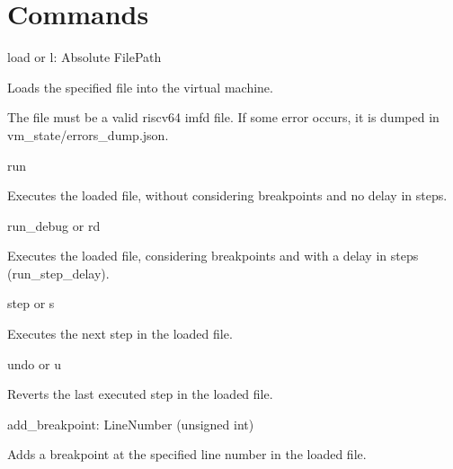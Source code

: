 \chapter{Commands}
\hypertarget{md_COMMANDS}{}\label{md_COMMANDS}
\label{md_COMMANDS_autotoc_md0}%
%

\begin{DoxyItemize}
\item {\ttfamily load} or {\ttfamily l}\+: {\ttfamily Absolute File\+Path} ~\newline

\begin{DoxyItemize}
\item Loads the specified file into the virtual machine.
\item The file must be a valid riscv64 imfd file. If some error occurs, it is dumped in {\ttfamily vm\+\_\+state/errors\+\_\+dump.\+json}.
\end{DoxyItemize}
\item {\ttfamily run}
\begin{DoxyItemize}
\item Executes the loaded file, without considering breakpoints and no delay in steps.
\end{DoxyItemize}
\item {\ttfamily run\+\_\+debug} or {\ttfamily rd}
\begin{DoxyItemize}
\item Executes the loaded file, considering breakpoints and with a delay in steps (run\+\_\+step\+\_\+delay).
\end{DoxyItemize}
\item {\ttfamily step} or {\ttfamily s}
\begin{DoxyItemize}
\item Executes the next step in the loaded file.
\end{DoxyItemize}
\item {\ttfamily undo} or {\ttfamily u}
\begin{DoxyItemize}
\item Reverts the last executed step in the loaded file.
\end{DoxyItemize}
\item {\ttfamily add\+\_\+breakpoint}\+: {\ttfamily Line\+Number} (unsigned int)
\begin{DoxyItemize}
\item Adds a breakpoint at the specified line number in the loaded file.
\end{DoxyItemize}

\end{DoxyItemize}
